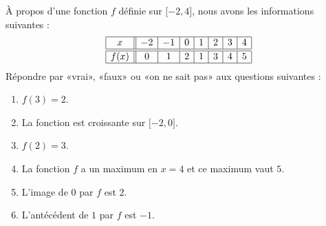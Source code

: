 
\begin{exercice}\label{exosmath-0489}

    À propos d'une fonction \( f\) définie sur \( \mathopen[ -2 , 4 \mathclose]\), nous avons les informations suivantes :
    \begin{equation*}
        \begin{array}[]{|c||c|c|c|c|c|c|c|}
            \hline
            x&-2&-1&0&1&2&3&4\\
            \hline\hline
            f(x)&0&1&2&1&3&4&5\\
            \hline
        \end{array}
    \end{equation*}
    Répondre par «vrai», «faux» ou «on ne sait pas» aux questions suivantes :
    \begin{enumerate}
        \item
            \( f(3)=2\).
        \item
            La fonction est croissante sur \( \mathopen[ -2 , 0 \mathclose]\).
        \item
            \( f(2)=3\).
        \item
            La fonction \( f\) a un maximum en \( x=4\) et ce maximum vaut \( 5\).
        \item
            L'image de \( 0\) par \( f\) est \( 2\).
        \item
            L'antécédent de \( 1\) par \( f\) est \( -1\).
    \end{enumerate}

\end{exercice}
